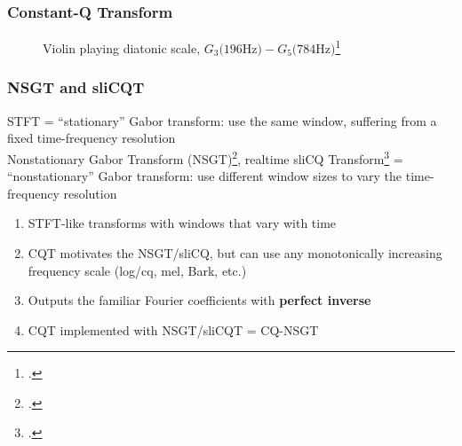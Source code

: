 \documentclass[usenames,dvipsnames]{beamer}
\begin{document}
\begin{frame}
	\frametitle{Constant-Q Transform}
	\begin{figure}
		\setcounter{subfigure}{0}
		\centering
		\caption{Violin playing diatonic scale, $G_{3} \text{(196Hz)} - G_{5} \text{(784Hz)}$\footcite{jbrown}}
	\end{figure}
\end{frame}

\begin{frame}
	\frametitle{NSGT and sliCQT}
	STFT = ``stationary'' Gabor transform: use the same window, suffering from a fixed time-frequency resolution\\
	Nonstationary Gabor Transform (NSGT)\footcite{balazs}, realtime sliCQ Transform\footcite{invertiblecqt, slicq, variableq1} = ``nonstationary'' Gabor transform: use different window sizes to vary the time-frequency resolution\\
	\begin{enumerate}
	\item
		STFT-like transforms with windows that vary with time
	\item
		CQT motivates the NSGT/sliCQ, but can use any monotonically increasing frequency scale (log/cq, mel, Bark, etc.)
	\item
		Outputs the familiar Fourier coefficients with \textbf{perfect inverse}
	\item
		CQT implemented with NSGT/sliCQT = CQ-NSGT
	\end{enumerate}
\end{frame}
\end{document}
